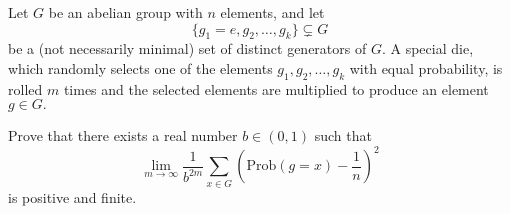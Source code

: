 Let $G$ be an abelian group with $n$ elements, and let \[\{g_1=e,g_2,\dots,g_k\}\subsetneq G\] be a (not necessarily minimal) set of distinct generators of $G.$ A special die, which randomly selects one of the elements $g_1,g_2,\dots,g_k$ with equal probability, is rolled $m$ times and the selected elements are multiplied to produce an element $g\in G.$

Prove that there exists a real number $b\in(0,1)$ such that \[\lim_{m\to\infty}\frac1{b^{2m}}\sum_{x\in G}\left(\mathrm{Prob}(g=x)-\frac1n\right)^2\] is positive and finite.